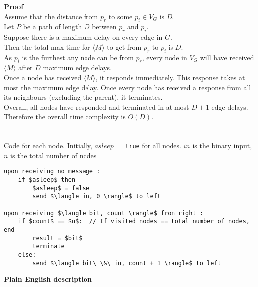 \documentclass[11pt]{article}
\begin{document}
\textbf{Proof}\\
Assume that the distance from $p_r$ to some $p_i \in V_G$ is $D$.\\
Let $P$ be a path of length $D$ between $p_r$ and $p_i$.\\
Suppose there is a maximum delay on every edge in $G$.\\
Then the total max time for $\langle M \rangle$ to get from $p_r$ to $p_i$ is $D$.\\
As $p_i$ is the furthest any node can be from $p_r$, every node in $V_G$ will have received $\langle M \rangle$ after $D$ maximum edge delays. \\
Once a node has received $\langle M \rangle$, it responds immediately. This response takes at most the maximum edge delay. Once every node has received a response from all its neighbours (excluding the parent), it terminates.\\
Overall, all nodes have responded and terminated in at most $D+1$ edge delays.\\
Therefore the overall time complexity is $O(D)$.


\section{}

\subsection{}



\subsection{}

Code for each node. Initially, $asleep =$ \texttt{true} for all nodes. $in$ is the binary input, $n$ is the total number of nodes

\begin{lstlisting}
upon receiving no message :
	if $asleep$ then
		$asleep$ = false
		send $\langle in, 0 \rangle$ to left

upon receiving $\langle bit, count \rangle$ from right :
	if $count$ == $n$:  // If visited nodes == total number of nodes, end
		result = $bit$
		terminate
	else:
		send $\langle bit\ \&\ in, count + 1 \rangle$ to left

\end{lstlisting}

\textbf{Plain English description}
\end{document}
